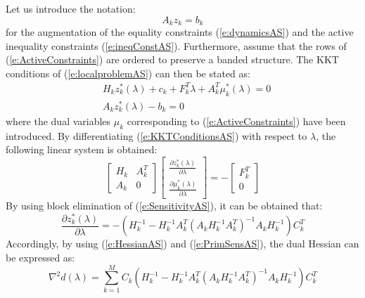 Let us introduce the notation:
\begin{equation}
\label{e:ActiveConstraints}
A_k z_k = b_k
\end{equation}
for the augmentation of the equality constraints (\ref{e:dynamicsAS}) and the active inequality constraints (\ref{e:ineqConstAS}). Furthermore, assume that the rows of (\ref{e:ActiveConstraints}) are ordered to preserve a banded structure. The KKT conditions of (\ref{e:localproblemAS}) can then be stated as:
\begin{equation} \label{e:KKTConditionsAS}
\begin{aligned}
& H_k z_k^*(\lambda) + c_k + F_k^T \lambda + A_k^T \mu_k^*(\lambda) = 0 \\
& A_k z_k^*(\lambda) - b_k = 0
\end{aligned}
\end{equation}
where the dual variables $\mu_k$ corresponding to (\ref{e:ActiveConstraints}) have been introduced. By differentiating (\ref{e:KKTConditionsAS}) with respect to $\lambda$, the following linear system is obtained:
\begin{equation} \label{e:SensitivityAS}
\left[ \begin{array}{cc}
H_k & A_k^T \\
A_k & 0
\end{array} \right]
\left[ \begin{array}{c}
\frac{\partial z_k^*(\lambda)}{\partial \lambda} \\
\frac{\partial \mu_k^*(\lambda)}{\partial \lambda}
\end{array} \right] = -
\left[ \begin{array}{c}
F_k^T \\
0
\end{array} \right] 
\end{equation}
By using block elimination of (\ref{e:SensitivityAS}), it can be obtained that:
\begin{equation} \label{e:PrimSensAS}
\frac{\partial z_k^*(\lambda)}{\partial \lambda} = -\left(H_k^{-1} - H_k^{-1} A_k^T(A_k H_k^{-1} A_k^T )^{-1} A_k H_k^{-1} \right) C_k^T
\end{equation}
Accordingly, by using (\ref{e:HessianAS}) and (\ref{e:PrimSensAS}), the dual Hessian can be expressed as:
\begin{equation} \label{e:HessianAS2}
\nabla^2 d(\lambda) = \sum_{k=1}^M C_k \left(H_k^{-1} - H_k^{-1} A_k^T(A_k H_k^{-1} A_k^T )^{-1} A_k H_k^{-1} \right) C_k^T
\end{equation}

